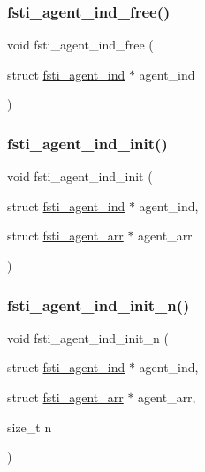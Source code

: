 \mbox{\label{fsti-agent_8h_ab9adb18f274475832c5a763be7d001d7}} 
\subsubsection{\texorpdfstring{fsti\+\_\+agent\+\_\+ind\+\_\+free()}{fsti\_agent\_ind\_free()}}
{\footnotesize\ttfamily void fsti\+\_\+agent\+\_\+ind\+\_\+free (\begin{DoxyParamCaption}\item[{struct \mbox{\hyperlink{structfsti__agent__ind}{fsti\+\_\+agent\+\_\+ind}} $\ast$}]{agent\+\_\+ind }\end{DoxyParamCaption})}

\mbox{\label{fsti-agent_8h_a15fb161e3b2c757f6dc7d67af4e6ef3d}} 
\subsubsection{\texorpdfstring{fsti\+\_\+agent\+\_\+ind\+\_\+init()}{fsti\_agent\_ind\_init()}}
{\footnotesize\ttfamily void fsti\+\_\+agent\+\_\+ind\+\_\+init (\begin{DoxyParamCaption}\item[{struct \mbox{\hyperlink{structfsti__agent__ind}{fsti\+\_\+agent\+\_\+ind}} $\ast$}]{agent\+\_\+ind,  }\item[{struct \mbox{\hyperlink{structfsti__agent__arr}{fsti\+\_\+agent\+\_\+arr}} $\ast$}]{agent\+\_\+arr }\end{DoxyParamCaption})}

\mbox{\label{fsti-agent_8h_a863d835b0643a8d62d8621bd512fd902}} 
\subsubsection{\texorpdfstring{fsti\+\_\+agent\+\_\+ind\+\_\+init\+\_\+n()}{fsti\_agent\_ind\_init\_n()}}
{\footnotesize\ttfamily void fsti\+\_\+agent\+\_\+ind\+\_\+init\+\_\+n (\begin{DoxyParamCaption}\item[{struct \mbox{\hyperlink{structfsti__agent__ind}{fsti\+\_\+agent\+\_\+ind}} $\ast$}]{agent\+\_\+ind,  }\item[{struct \mbox{\hyperlink{structfsti__agent__arr}{fsti\+\_\+agent\+\_\+arr}} $\ast$}]{agent\+\_\+arr,  }\item[{size\+\_\+t}]{n }\end{DoxyParamCaption})}


